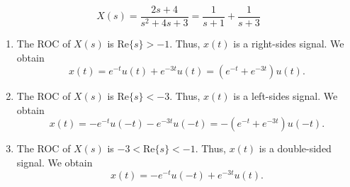\begin{frame}[t]{}
    {
            \begin{equation*}
                X(s) = \frac{2s+4}{s^2 + 4s+ 3} = \frac{1}{s+1} + \frac{1}{s+3}
            \end{equation*}

        \begin{enumerate}
            \item<2-> The ROC of $X(s)$ is $\mathrm{Re}\{s\} > -1$. Thus, $x(t)$ is a right-sides signal. We obtain
            \begin{equation*}
                x(t) = e^{-t}u(t) + e^{-3t}u(t) = (e^{-t}+ e^{-3t})u(t).
            \end{equation*}

            \item<3-> The ROC of $X(s)$ is $\mathrm{Re}\{s\} < -3$. Thus, $x(t)$ is a left-sides signal. We obtain
            \begin{equation*}
                x(t) = -e^{-t}u(-t) - e^{-3t}u(-t) = -(e^{-t}+ e^{-3t})u(-t).
            \end{equation*}

            \item<4-> The ROC of $X(s)$ is $-3 < \mathrm{Re}\{s\} < -1$. Thus, $x(t)$ is a double-sided signal. We obtain
            \begin{equation*}
                x(t) = -e^{-t}u(-t) + e^{-3t}u(t).
            \end{equation*}
        \end{enumerate}
    }
\end{frame}

